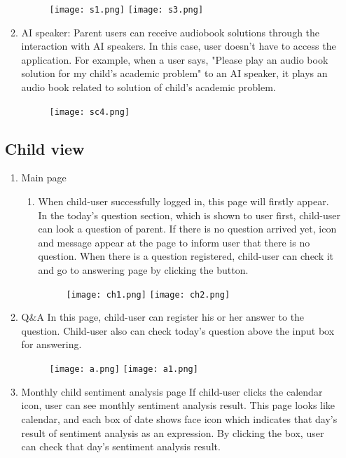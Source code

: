 \documentclass[conference]{IEEEtran}
\begin{document}
\begin{enumerate}
\begin{enumerate}
                  \begin{figure}[H]
                 \centering
                 \texttt{[image: s1.png]}
                 \texttt{[image: s3.png]}
                 \end{figure}
                \item AI speaker: Parent users can receive audiobook solutions through the interaction with AI speakers. In this case, user doesn't have to access the application. For example, when a user says, "Please play an audio book solution for my child's academic problem" to an AI speaker, it plays an audio book related to solution of child's academic problem.
                 \begin{figure}[H]
                 \centering
                 \texttt{[image: sc4.png]}
                 \end{figure}
            \end{enumerate}
\newpage
        \subsection{Child view}
        \begin{enumerate}
            \item Main page
            
            \begin{enumerate}
                \item When child-user successfully logged in, this page will firstly appear. In the today’s question section, which is shown to user first, child-user can look a question of parent. If there is no question arrived yet, icon and message appear at the page to inform user that there is no question. When there is a question registered, child-user can check it and go to answering page by clicking the button.
                \begin{figure}[H]
                 \centering
                 \texttt{[image: ch1.png]}
                 \texttt{[image: ch2.png]}
                 \end{figure}
                 
            \end{enumerate}
            \newpage
            \item Q\&A \hfill\break
            In this page, child-user can register his or her answer to the question. Child-user also can check today’s question above the input box for answering.
            \begin{figure}[H]
                 \centering
                 \texttt{[image: a.png]}
                 \texttt{[image: a1.png]}
                 \end{figure}
            \item Monthly child sentiment analysis page \hfill \break
            If child-user clicks the calendar icon, user can see monthly sentiment analysis result. This page looks like calendar, and each box of date shows face icon which indicates that day’s result of sentiment analysis as an expression. By clicking the box, user can check that day’s sentiment analysis result.
        \end{enumerate}
        \end{enumerate}
\newpage
\end{document}
